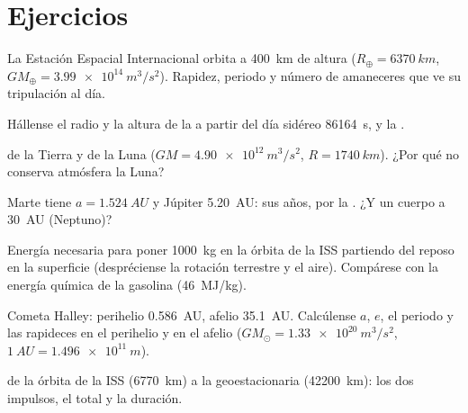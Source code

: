 \section{Ejercicios}

\begin{exercise}[$\star$]\label{exo:b1:central-forces:1}
La Estación Espacial Internacional orbita a \qty{400}{km} de altura
($R_\oplus = \qty{6370}{km}$, $GM_\oplus = \qty{3.99e14}{m^3/s^2}$).
Rapidez, periodo y número de amaneceres que ve su tripulación al día.
\end{exercise}

\begin{exercise}[$\star$]\label{exo:b1:central-forces:2}
Hállense el radio y la altura de la  a partir del
día sidéreo \qty{86164}{s}, y la .
\end{exercise}

\begin{exercise}[$\star$]\label{exo:b1:central-forces:3}
 de la Tierra y de la Luna ($GM = \qty{4.90e12}{m^3/s^2}$,
$R = \qty{1740}{km}$). ¿Por qué no conserva atmósfera la Luna?
\end{exercise}

\begin{exercise}[$\star$]\label{exo:b1:central-forces:4}
Marte tiene $a = \qty{1.524}{AU}$ y Júpiter \qty{5.20}{AU}: sus años, por
la . ¿Y un cuerpo a \qty{30}{AU} (Neptuno)?
\end{exercise}

\begin{exercise}[$\star\star$]\label{exo:b1:central-forces:5}
Energía necesaria para poner \qty{1000}{kg} en la órbita de la ISS
partiendo del reposo en la superficie (despréciense la rotación terrestre
y el aire). Compárese con la energía química de la gasolina (\qty{46}{MJ/kg}).
\end{exercise}

\begin{exercise}[$\star\star$]\label{exo:b1:central-forces:6}
Cometa Halley: perihelio \qty{0.586}{AU}, afelio \qty{35.1}{AU}.
Calcúlense $a$, $e$, el periodo y las rapideces en el perihelio y en el
afelio ($GM_\odot = \qty{1.33e20}{m^3/s^2}$, $\qty{1}{AU} = \qty{1.496e11}{m}$).
\end{exercise}

\begin{exercise}[$\star\star$]\label{exo:b1:central-forces:7}
 de la órbita de la ISS (\qty{6770}{km}) a la
geoestacionaria (\qty{42200}{km}): los dos impulsos, el total y la duración.
\end{exercise}

